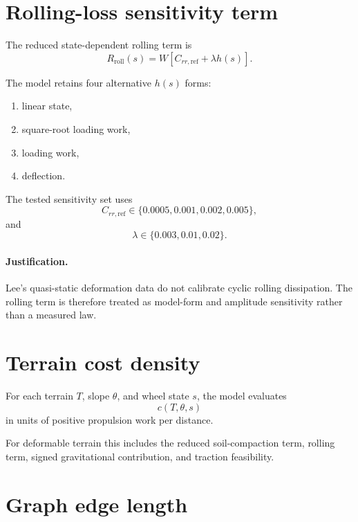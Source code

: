 \documentclass[11pt]{article}
\begin{document}
\section{Rolling-loss sensitivity term}

The reduced state-dependent rolling term is
\begin{equation}
R_{\mathrm{roll}}(s)
=
W
\left[
C_{rr,\mathrm{ref}}+\lambda h(s)
\right].
\end{equation}

The model retains four alternative $h(s)$ forms:
\begin{enumerate}[label=(\arabic*)]
\item linear state,
\item square-root loading work,
\item loading work,
\item deflection.
\end{enumerate}

The tested sensitivity set uses
\begin{equation}
C_{rr,\mathrm{ref}}
\in\{0.0005,0.001,0.002,0.005\},
\end{equation}
and
\begin{equation}
\lambda\in\{0.003,0.01,0.02\}.
\end{equation}

\paragraph{Justification.}
Lee's quasi-static deformation data do not calibrate cyclic rolling dissipation. The rolling term is therefore treated as model-form and amplitude sensitivity rather than a measured law.

\section{Terrain cost density}

For each terrain $T$, slope $\theta$, and wheel state $s$, the model evaluates
\begin{equation}
c(T,\theta,s)
\end{equation}
in units of positive propulsion work per distance.

For deformable terrain this includes the reduced soil-compaction term, rolling term, signed gravitational contribution, and traction feasibility.

\section{Graph edge length}
\end{document}
